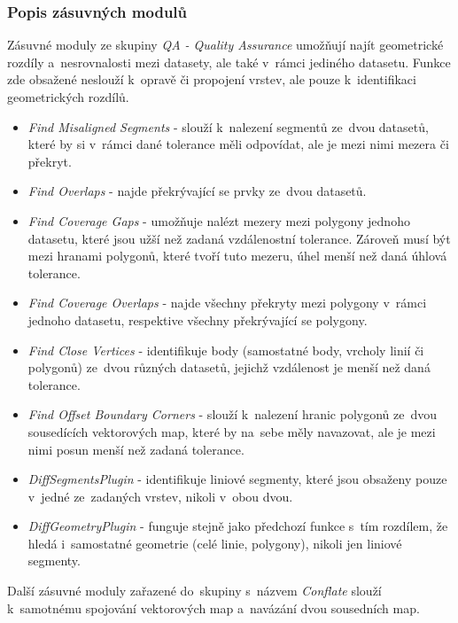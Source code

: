 \subsubsection{Popis zásuvných modulů}
\label{jcs-plugin}

Zásuvné moduly ze skupiny \textit{QA - Quality Assurance} umožňují najít
geometrické rozdíly a~nesrovnalosti mezi datasety, ale také v~rámci jediného
datasetu. Funkce zde obsažené neslouží k~opravě či propojení vrstev, ale 
pouze k~identifikaci geometrických rozdílů.

\begin{itemize}
 \item \textit{Find Misaligned Segments} - slouží k~nalezení segmentů 
    ze~dvou datasetů, které by si v~rámci dané tolerance měli odpovídat,
    ale je mezi nimi mezera či překryt. 
 \item \textit{Find Overlaps} - najde překrývající se prvky ze~dvou datasetů.
 \item \textit{Find Coverage Gaps} - umožňuje nalézt mezery mezi polygony
    jednoho datasetu, které jsou užší než zadaná vzdálenostní tolerance.
    Zároveň musí být mezi hranami polygonů, které tvoří tuto mezeru, úhel menší
    než daná úhlová tolerance.
 \item \textit{Find Coverage Overlaps} - najde všechny překryty mezi polygony
    v~rámci jednoho data\-setu, respektive všechny překrývající se polygony.
 \item \textit{Find Close Vertices} - identifikuje body (samostatné body,
    vrcholy linií či polygonů) ze~dvou různých datasetů, jejichž vzdálenost
    je menší než daná tolerance.
 \item \textit{Find Offset Boundary Corners} - slouží k~nalezení hranic
    polygonů ze~dvou sou\-sedících vektorových map, které by na~sebe měly
    navazovat, ale je mezi nimi posun menší než zadaná tolerance.
 \item \textit{DiffSegmentsPlugin} - identifikuje liniové segmenty, které
    jsou obsaženy pouze v~jedné ze~zadaných vrstev, nikoli v~obou dvou.
 \item \textit{DiffGeometryPlugin} - funguje stejně jako předchozí funkce
    s~tím rozdílem, že hledá i~samostatné geometrie (celé linie, polygony),
    nikoli jen liniové segmenty.
\end{itemize}

Další zásuvné moduly zařazené do~skupiny s~názvem \textit{Conflate} slouží
k~samo\-tnému spojování vektorových map a~navázání dvou sousedních map.

